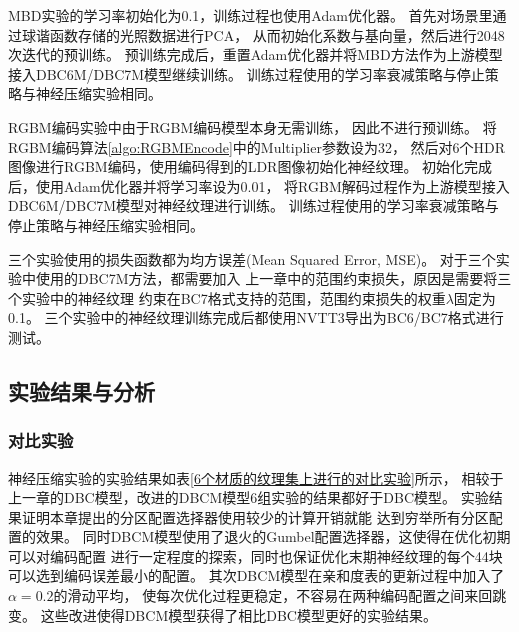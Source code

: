 MBD实验的学习率初始化为0.1，训练过程也使用Adam优化器。
首先对场景里通过球谐函数存储的光照数据进行PCA，
从而初始化系数与基向量，然后进行2048次迭代的预训练。
预训练完成后，重置Adam优化器并将MBD方法作为上游模型接入DBC6M/DBC7M模型继续训练。
训练过程使用的学习率衰减策略与停止策略与神经压缩实验相同。

RGBM编码实验中由于RGBM编码模型本身无需训练，
因此不进行预训练。
将RGBM编码算法\ref{algo:RGBMEncode}中的Multiplier参数设为32，
然后对6个HDR图像进行RGBM编码，使用编码得到的LDR图像初始化神经纹理。
初始化完成后，使用Adam优化器并将学习率设为0.01，
将RGBM解码过程作为上游模型接入DBC6M/DBC7M模型对神经纹理进行训练。
训练过程使用的学习率衰减策略与停止策略与神经压缩实验相同。

三个实验使用的损失函数都为均方误差(Mean Squared Error, MSE)。
对于三个实验中使用的DBC7M方法，都需要加入
上一章中的范围约束损失，原因是需要将三个实验中的神经纹理
约束在BC7格式支持的范围，范围约束损失的权重$\lambda$固定为0.1。
三个实验中的神经纹理训练完成后都使用NVTT3导出为BC6/BC7格式进行测试。

\subsection{实验结果与分析}

\subsubsection{对比实验}
\label{4:对比实验}

神经压缩实验的实验结果如表\ref{6个材质的纹理集上进行的对比实验}所示，
相较于上一章的DBC模型，改进的DBCM模型6组实验的结果都好于DBC模型。
实验结果证明本章提出的分区配置选择器使用较少的计算开销就能
达到穷举所有分区配置的效果。
同时DBCM模型使用了退火的Gumbel配置选择器，这使得在优化初期可以对编码配置
进行一定程度的探索，同时也保证优化末期神经纹理的每个4\times4块可以选到编码误差最小的配置。
其次DBCM模型在亲和度表的更新过程中加入了$\alpha=0.2$的滑动平均，
使每次优化过程更稳定，不容易在两种编码配置之间来回跳变。
这些改进使得DBCM模型获得了相比DBC模型更好的实验结果。

